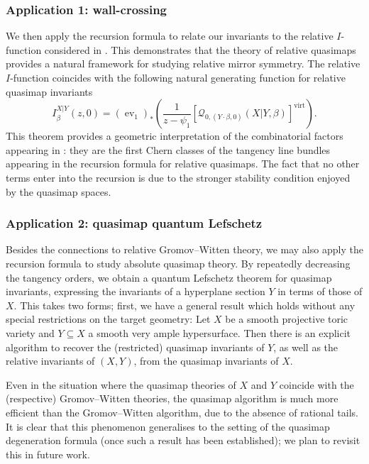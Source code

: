 \documentclass[10pt]{amsart}
\newcommand{\Q}[4]{\mathcal{Q}_{#1,#2}(#3,#4)}
\newcommand{\virt}[1]{[#1]^{\operatorname{virt}}}
\newcommand{\ev}{\operatorname{ev}}
\theoremstyle{definition}
\newenvironment{customthm}[1]
  {\renewcommand\theinnercustomthm{#1}\innercustomthm}
  {\endinnercustomthm}
\theoremstyle{definition}
\begin{document}
\subsubsection{Application 1: wall-crossing} We then apply the recursion formula to relate our invariants to the relative $I$-function considered in \cite{FanTsengYou}. This demonstrates that the theory of relative quasimaps provides a natural framework for studying relative mirror symmetry.
\begin{customthm}{A}[\textbf{Theorem \ref{wallcrossing thm}}]\label{thmA} The relative $I$-function coincides with the following natural generating function for relative quasimap invariants
\begin{equation*}I^{X|Y}_\beta(z,0) = (\ev_1)_*\left( \frac{1}{z-\psi_1}\virt{\Q{0}{(Y\cdot\beta,0)}{X|Y}{\beta}}\right).\end{equation*}
\end{customthm}
This theorem provides a geometric interpretation of the combinatorial factors appearing in \cite[Theorem 4.3]{FanTsengYou}: they are the first Chern classes of the tangency line bundles appearing in the recursion formula for relative quasimaps. The fact that no other terms enter into the recursion is due to the stronger stability condition enjoyed by the quasimap spaces.


\subsubsection{Application 2: quasimap quantum Lefschetz} Besides the connections to relative Gromov--Witten theory, we may also apply the recursion formula to study absolute quasimap theory. By repeatedly decreasing the tangency orders, we obtain a quantum Lefschetz theorem for quasimap invariants, expressing the invariants of a hyperplane section $Y$ in terms of those of $X$. This takes two forms; first, we have a general result which holds without any special restrictions on the target geometry:
\begin{customthm}{B}[\textbf{Theorem \ref{Theorem full quasimap Lefschetz}}] \label{thmB} Let $X$ be a smooth projective toric variety and $Y \subseteq X$ a smooth very ample hypersurface. Then there is an explicit algorithm to recover the (restricted) quasimap invariants of $Y$, as well as the relative invariants of $(X,Y)$, from the quasimap invariants of $X$.\end{customthm}

Even in the situation where the quasimap theories of $X$ and $Y$ coincide with the (respective) Gromov--Witten theories, the quasimap algorithm is much more efficient than the Gromov--Witten algorithm, due to the absence of rational tails. It is clear that this phenomenon generalises to the setting of the quasimap degeneration formula (once such a result has been established); we plan to revisit this in future work.
\end{document}
